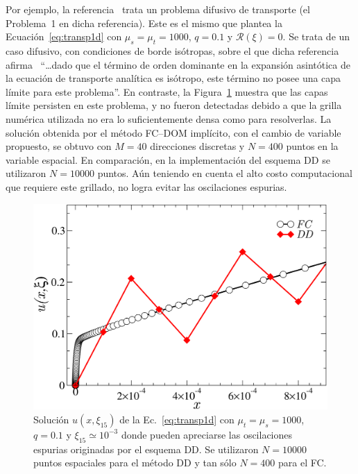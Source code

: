 Por ejemplo, la referencia~\cite{Larsen1987} trata un problema 
difusivo de transporte (el Problema~1 en dicha referencia). 
Este es el mismo que plantea la Ecuación~\eqref{eq:transp1d} con $\mu_s=\mu_t=1000$,
 $q=0.1$ y $\mathcal{R}(\xi)=0$. Se trata de un caso  
 difusivo, con condiciones de borde isótropas, 
 sobre el que dicha referencia afirma~\cite[pp. 317]{Larsen1987} 
 ``\ldots dado que el término de orden dominante en la expansión asintótica 
 de la ecuación de transporte analítica es isótropo, 
 este término no posee una capa límite para este problema''. 
 En contraste, la Figura~\ref{fig:DDlayer} muestra que 
 las capas límite persisten en este problema, y 
 no fueron detectadas debido a que la grilla numérica utilizada 
 no era lo suficientemente densa como para resolverlas. 
 La solución obtenida por el método FC--DOM implícito,  
 con el cambio de variable propuesto, se obtuvo 
 con $M=40$ direcciones discretas y $N=400$ puntos 
 en la variable espacial. En comparación, en la implementación del esquema DD 
 se utilizaron $N=10000$ puntos. Aún teniendo en cuenta 
 el alto costo computacional que requiere este grillado, no logra 
 evitar las oscilaciones espurias.
\begin{figure}[h!]
\centering
  \includegraphics[width=0.5\linewidth]{figuras/layerlar.pdf}
  \caption{Solución $u(x,\xi_{15})$ de la Ec.~\eqref{eq:transp1d} 
  con $\mu_t=\mu_s=1000$, $q=0.1$ y $\xi_{\text{15}} \simeq 10^{-3}$
  donde pueden apreciarse las oscilaciones espurias originadas 
  por el esquema DD. Se utilizaron $N=10000$ puntos espaciales para el método DD y 
  tan sólo $N=400$ para el FC.}
 \label{fig:DDlayer}
\end{figure}

